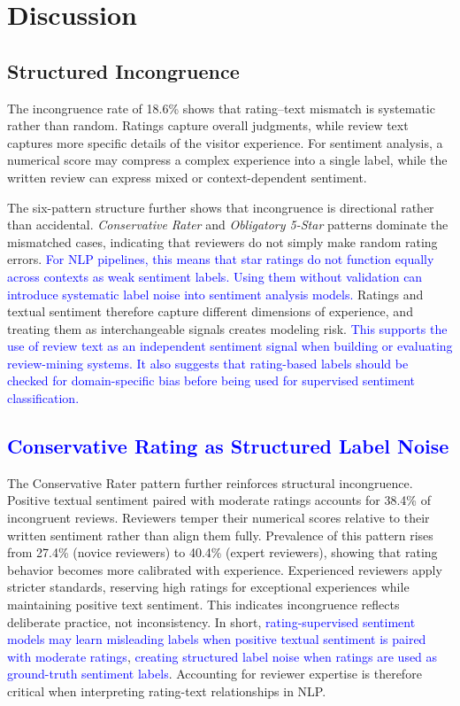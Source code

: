 \documentclass[conference]{IEEEtran}
\newcommand{\changed}[1]{\textcolor{blue}{#1}}
\begin{document}
\section{Discussion}
\subsection{Structured Incongruence}

The incongruence rate of 18.6\% shows that rating--text mismatch is systematic rather than random. Ratings capture overall judgments, while review text captures more specific details of the visitor experience. For sentiment analysis, a numerical score may compress a complex experience into a single label, while the written review can express mixed or context-dependent sentiment.

The six-pattern structure further shows that incongruence is directional rather than accidental. \textit{Conservative Rater} and \textit{Obligatory 5-Star} patterns dominate the mismatched cases, indicating that reviewers do not simply make random rating errors. \changed{For NLP pipelines, this means that star ratings do not function equally across contexts as weak sentiment labels.} \changed{Using them without validation can introduce systematic label noise into sentiment analysis models.} Ratings and textual sentiment therefore capture different dimensions of experience, and treating them as interchangeable signals creates modeling risk. \changed{This supports the use of review text as an independent sentiment signal when building or evaluating review-mining systems.} \changed{It also suggests that rating-based labels should be checked for domain-specific bias before being used for supervised sentiment classification.}

\subsection{\changed{Conservative Rating as Structured Label Noise}}

The Conservative Rater pattern further reinforces structural incongruence. Positive textual sentiment paired with moderate ratings accounts for 38.4\% of incongruent reviews. Reviewers temper their numerical scores relative to their written sentiment rather than align them fully.
Prevalence of this pattern rises from 27.4\% (novice reviewers) to 40.4\% (expert reviewers), showing that rating behavior becomes more calibrated with experience. Experienced reviewers apply stricter standards, reserving high ratings for exceptional experiences while maintaining positive text sentiment. This indicates incongruence reflects deliberate practice, not inconsistency. In short, \changed{rating-supervised sentiment models may learn misleading labels when positive textual sentiment is paired with moderate ratings}, \changed{creating structured label noise when ratings are used as ground-truth sentiment labels}. Accounting for reviewer expertise is therefore critical when interpreting rating-text relationships in NLP.
\end{document}
